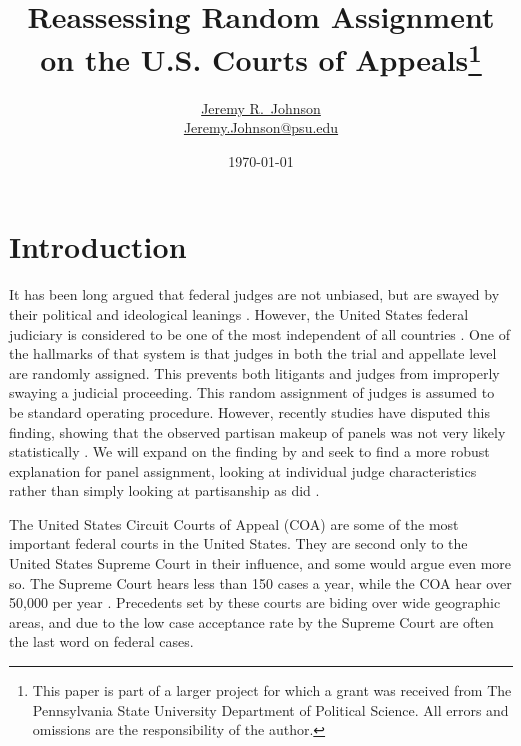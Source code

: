 \documentclass[12pt]{article}
\title{Reassessing Random Assignment on the U.S. Courts of Appeals\footnote{This paper is part of a larger project for which a grant was received from The Pennsylvania State University Department of Political Science.  All errors and omissions are the responsibility of the author.} }
\author{\href{http://www.jeremyrjohnson.org/}{Jeremy R.\ Johnson}\\ \href{mailto:Jeremy.Johnson@psu.edu}{Jeremy.Johnson@psu.edu}}
\affil{Pennsylvania State University}
\date{\today}
\begin{document}
\clearpage\maketitle\thispagestyle{empty}



\clearpage
\setcounter{page}{1}
\setcounter{footnote}{0}
\renewcommand*{\thefootnote}{\arabic{footnote}}
\addtolength{\footnotesep}{6pt}


\section{Introduction}
It has been long argued that federal judges are not unbiased, but are swayed by their political and ideological leanings \citep{segal2002supreme}.  However, the United States federal judiciary is considered to be one of the most independent of all countries \citep{Linzer2014}.  One of the hallmarks of that system is that judges in both the trial and appellate level are randomly assigned.  This prevents both litigants and judges from improperly swaying a judicial proceeding.  This random assignment of judges is assumed to be standard operating procedure.  However, recently studies have disputed this finding, showing that the observed partisan makeup of panels was not very likely statistically \citep{Chilton2014}.  We will expand on the finding by \citeauthor{Chilton2014} and seek to find a more robust explanation for panel assignment, looking at individual judge characteristics rather than simply looking at partisanship as did \citet{Chilton2014}.

The United States Circuit Courts of Appeal (COA) are some of the most important federal courts in the United States.  They are second only to the United States Supreme Court in their influence, and some would argue even more so.  The Supreme Court hears less than 150 cases a year, while the COA hear over 50,000 per year \citep{Caseloadstats}.  Precedents set by these courts are biding over wide geographic areas, and due to the low case acceptance rate by the Supreme Court are often the last word on federal cases.
\end{document}
